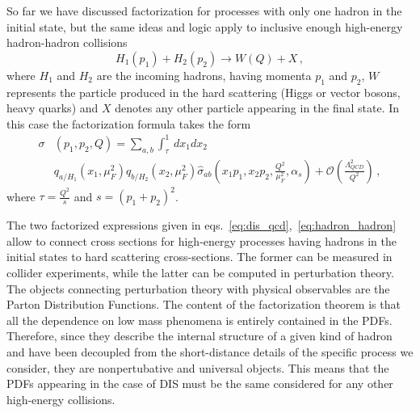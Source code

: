 %
So far we have discussed factorization for processes with only one hadron in the initial state, but
the same ideas and logic apply to inclusive enough high-energy hadron-hadron collisions
$$
H_1\left(p_1\right) + H_2\left(p_2\right) \rightarrow W\left(Q\right) + X\,,
$$
where $H_1$ and $H_2$ are the incoming hadrons, having momenta $p_1$ and $p_2$, $W$ represents
the particle produced in the hard scattering (Higgs or vector bosons, heavy quarks) and $X$
denotes any other particle appearing in the final state. In this case the factorization formula takes the form
\begin{align}
    \label{eq:hadron_hadron}
    \sigma&\left(p_1,p_2,Q\right) = \sum_{a,b}\int_{\tau}^1\, 
    dx_1 dx_2 \, \nonumber \\ 
    &q_{a/H_1}\left(x_1,\mu_F^2\right)q_{b/H_2}\left(x_2,\mu_F^2\right)
    \hat{\sigma}_{ab}\left(x_1p_1,x_2p_2,\frac{Q^2}{\mu_F^2},\alpha_s\right) 
    + \mathcal{O}\left(\frac{\Lambda_{QCD}^2}{Q^2}\right)\,,
\end{align}
where $\tau = \frac{Q^2}{s}$ and $s=\left(p_1+p_2\right)^2$.

%
The two factorized expressions given in eqs.~\eqref{eq:dis_qcd},~\eqref{eq:hadron_hadron}
allow to connect cross sections for high-energy processes having hadrons in the initial states to hard scattering cross-sections.
The former can be measured in collider experiments, while the latter 
can be computed in perturbation theory. The objects connecting perturbation theory with physical observables are
the Parton Distribution Functions.
The content of the factorization theorem is that all the dependence
on low mass phenomena is entirely contained in the PDFs. Therefore, since they describe the internal structure 
of a given kind of hadron and have been decoupled from the short-distance details of
the specific process we consider, they are nonpertubative and universal objects.
This means that the PDFs appearing in the case of DIS must be the same considered for 
any other high-energy collisions.

